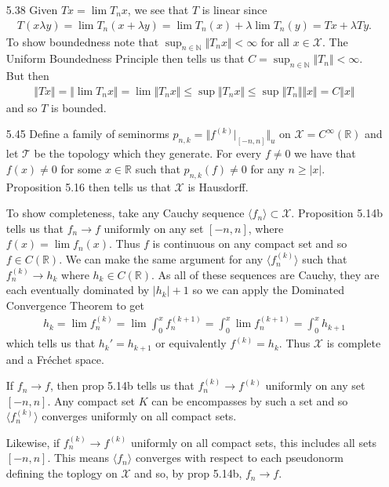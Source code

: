 \documentclass[11pt,letter]{article}
\begin{document}
\begin{enumerate}
\item [5.38] Given $Tx = \lim T_nx$, we see that $T$ is linear since
\begin{align*}
    T(x \lambda y) = \lim T_n(x + \lambda y) = \lim T_n(x) + \lambda \lim T_n(y) = Tx + \lambda Ty.
\end{align*}
To show boundedness note that $\sup_{n \in \mathbb N}\Vert T_n x \Vert < \infty$ for all $x \in \mathcal{X}$. The Uniform Boundedness Principle then tells us that $C = \sup_{n \in \mathbb N} \Vert T_n \Vert < \infty$. But then
\begin{align*}
    \Vert Tx \Vert = \Vert \lim T_n x \Vert = \lim \Vert T_n x \Vert \le \sup \Vert T_n x \Vert \le \sup \Vert T_n \Vert \Vert x \Vert = C \Vert x \Vert
\end{align*}
and so $T$ is bounded.

\item [5.45] Define a family of seminorms $p_{n,k}=\Vert f^{(k)}\vert_{[-n,n]} \Vert_u$ on $\mathcal{X} = C^\infty(\mathbb R)$ and let $\mathcal{T}$ be the topology which they generate. For every $f \ne 0$ we have that $f(x) \ne 0$ for some $x \in \mathbb R$ such that $p_{n,k}(f) \ne 0$ for any $n \ge \vert x \vert$. Proposition 5.16 then tells us that $\mathcal{X}$ is Hausdorff.

To show completeness, take any Cauchy sequence $\langle f_n \rangle \subset \mathcal{X}$. Proposition 5.14b tells us that $f_n \rightarrow f$ uniformly on any set $[-n,n]$, where $f(x) = \lim f_n(x)$. Thus $f$ is continuous on any compact set and so $f \in C(\mathbb R)$. We can make the same argument for any $\langle f_n^{(k)} \rangle$ such that $f_n^{(k)} \rightarrow h_k$ where $h_k \in C(\mathbb R)$. As all of these sequences are Cauchy, they are each eventually dominated by $\vert h_k \vert + 1$ so we can apply the Dominated Convergence Theorem to get
\begin{align*}
    h_k = \lim f_n^{(k)} = \lim \int_0^x f_n^{(k+1)} = \int_0^x \lim f_n^{(k+1)} = \int_0^x h_{k+1}
\end{align*}
which tells us that $h_k' = h_{k+1}$ or equivalently $f^{(k)} = h_{k}$. Thus $\mathcal{X}$ is complete and a Fr\'echet space.

If $f_n \rightarrow f$, then prop 5.14b tells us that $f_n^{(k)} \rightarrow f^{(k)}$ uniformly on any set $[-n,n]$. Any compact set $K$ can be encompasses by such a set and so $\langle f_n^{(k)} \rangle$ converges uniformly on all compact sets.

Likewise, if $f_n^{(k)} \rightarrow f^{(k)}$ uniformly on all compact sets, this includes all sets $[-n,n]$. This means $\langle f_n \rangle$ converges with respect to each pseudonorm defining the toplogy on $\mathcal{X}$ and so, by prop 5.14b, $f_n \rightarrow f$.


\end{enumerate}
\end{document}
